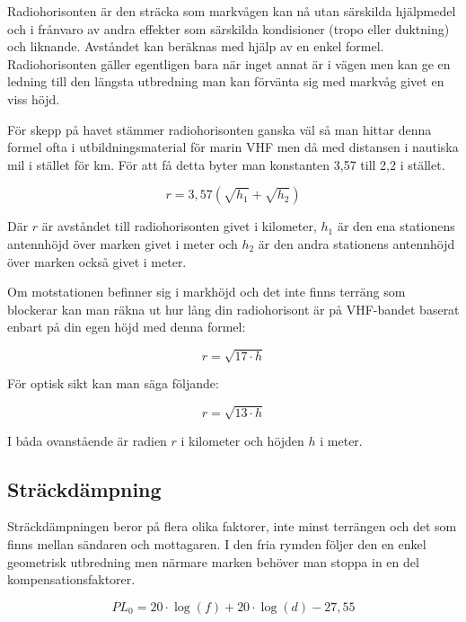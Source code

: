 Radiohorisonten är den sträcka som markvågen kan nå utan särskilda hjälpmedel
och i frånvaro av andra effekter som särskilda kondisioner (tropo eller
duktning) och liknande. Avståndet kan beräknas med hjälp av en enkel formel.
Radiohorisonten gäller egentligen bara när inget annat är i vägen men kan ge
en ledning till den längsta utbredning man kan förvänta sig med markvåg givet
en viss höjd.

För skepp på havet stämmer radiohorisonten ganska väl så man hittar denna
formel ofta i utbildningsmaterial för marin VHF men då med distansen i
nautiska mil i stället för km. För att få detta byter man konstanten 3,57 till
2,2 i stället.

\begin{equation}
	r = 3,57 \left(\sqrt{h_1}+\sqrt{h_2}\right)
\end{equation}

Där $r$ är avståndet till radiohorisonten givet i kilometer, $h_1$ är den ena
stationens antennhöjd över marken givet i meter och $h_2$ är den andra
stationens antennhöjd över marken också givet i meter.

Om motstationen befinner sig i markhöjd och det inte finns terräng som
blockerar kan man räkna ut hur lång din radiohorisont är på VHF-bandet baserat
enbart på din egen höjd med denna formel:

\begin{equation}
	r = \sqrt{17 \cdot h}
\end{equation}

För optisk sikt kan man säga följande:

\begin{equation}
	r = \sqrt{13 \cdot h}
\end{equation}

I båda ovanstående är radien $r$ i kilometer och höjden $h$ i meter.


\subsection{Sträckdämpning}

Sträckdämpningen beror på flera olika faktorer, inte minst terrängen och det
som finns mellan sändaren och mottagaren. I den fria rymden följer den en
enkel geometrisk utbredning men närmare marken behöver man stoppa in en del
kompensationsfaktorer.

\begin{equation}
	PL_0 = 20 \cdot \log(f) + 20 \cdot \log(d) - 27,55
\end{equation}

